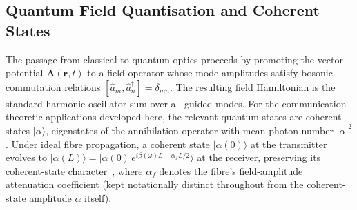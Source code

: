 \documentclass[journal,twocolumn]{IEEEtran}
\theoremstyle{definition}
\theoremstyle{plain}
\newcommand{\alphaf}{\alpha_{f}}
\begin{document}
\subsection{Quantum Field Quantisation and Coherent States}
\label{subsec:field_quant}

The passage from classical to quantum optics proceeds by promoting
the vector potential $\mathbf{A}(\mathbf{r},t)$ to a field operator
whose mode amplitudes satisfy bosonic commutation relations
$[\hat{a}_m, \hat{a}_n^\dagger] = \delta_{mn}$.  The resulting
field Hamiltonian is the standard harmonic-oscillator sum over all
guided modes.  For the communication-theoretic applications developed
here, the relevant quantum states are coherent states
$|\alpha\rangle$, eigenstates of the annihilation operator with mean
photon number $|\alpha|^2$.  Under ideal fibre propagation, a coherent
state $|\alpha(0)\rangle$ at the transmitter evolves to
$|\alpha(L)\rangle = |\alpha(0)\,e^{i\beta(\omega)L - \alphaf L/2}\rangle$
at the receiver, preserving its coherent-state character~\cite{loudon2000,kok2010},
where $\alphaf$ denotes the fibre's field-amplitude attenuation
coefficient (kept notationally distinct throughout from the
coherent-state amplitude $\alpha$ itself).
\end{document}
